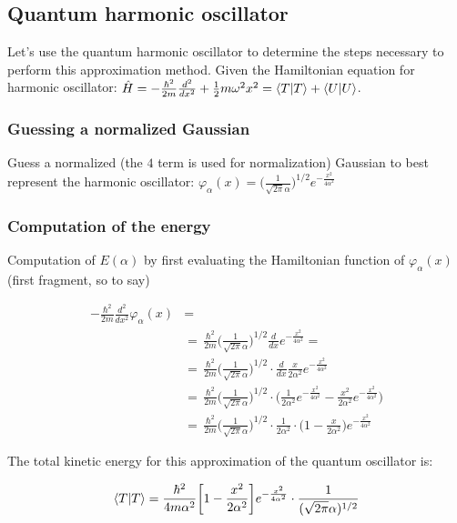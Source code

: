 	\subsection{Quantum harmonic oscillator}
	Let's use the quantum harmonic oscillator to determine the steps necessary to perform this approximation method.
	Given the Hamiltonian equation for harmonic oscillator: $\hat{H}=-\frac{\hbar^2}{2m}\frac{d^2}{dx^2}+\frac{1}{2}m\omega^2x^2=\braket{T}+\braket{U}$.

		\subsubsection{Guessing a normalized Gaussian}
		Guess a normalized (the $4$ term is used for normalization) Gaussian to best represent the harmonic oscillator: $\varphi_{\alpha}(x)=\bigg(\frac{1}{\sqrt{2\pi}\alpha}\bigg)^{1/2}e^{-{\frac{x^2}{4\alpha^2}}}$

		\subsubsection{Computation of the energy}
		Computation of $E(\alpha)$ by first evaluating the Hamiltonian function of $\varphi_{\alpha}(x)$ (first fragment, so to say)

		\begin{align*}
			-\frac{\hbar^2}{2m}\frac{d^2}{dx^2}\varphi_{\alpha}(x)&=\\
			&=\,\frac{\hbar^2}{2m}\bigg(\frac{1}{\sqrt{2\pi}\alpha}\bigg)^{1/2}\frac{d}{dx}e^{-{\frac{x^2}{4\alpha^2}}}=\\
			&=\,\frac{\hbar^2}{2m}\bigg(\frac{1}{\sqrt{2\pi}\alpha}\bigg)^{1/2}\cdot\frac{d}{dx}\frac{x}{2\alpha^2}e^{-{\frac{x^2}{4\alpha^2}}}\\
			&=\,\frac{\hbar^2}{2m}\bigg(\frac{1}{\sqrt{2\pi}\alpha}\bigg)^{1/2}\cdot\bigg(\frac{1}{2\alpha^2}e^{-{\frac{x^2}{4\alpha^2}}}-\frac{x^2}{2\alpha^2}e^{-\frac{x^2}{4\alpha^2}}\bigg)\\
			&=\,\frac{\hbar^2}{2m}\bigg(\frac{1}{\sqrt{2\pi}\alpha}\bigg)^{1/2}\cdot\frac{1}{2\alpha^2}\cdot\bigg(1-\frac{x}{2\alpha^2}\bigg)e^{-{\frac{x^2}{4\alpha^2}}}
		\end{align*}

		The total kinetic energy for this approximation of the quantum oscillator is:

		$$\braket{T}=\frac{\hbar^2}{4m\alpha^2}\bigg[1-\frac{x^2}{2\alpha^2}\bigg]e^{-{\frac{x^2}{4\alpha^2}}}\cdot\frac{1}{(\sqrt{2\pi}\alpha)^{1/2}}$$

